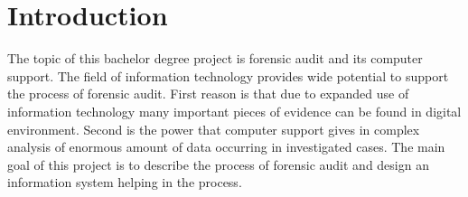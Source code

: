 \chapter*{Introduction} \label{Introduction}


The topic of this bachelor degree project is forensic audit and its computer support. The field of information technology provides wide potential to support the process of forensic audit. First reason is that due to expanded use of information technology many important pieces of evidence can be found in digital environment. Second is the power that computer support gives in complex analysis of enormous amount of data occurring in investigated cases. The main goal of this project is to describe the process of forensic audit and design an information system helping in the process. 



%
%


%






